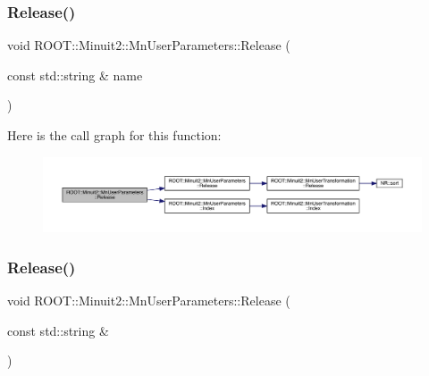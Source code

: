 \subsubsection{\texorpdfstring{Release()}{Release()}\hspace{0.1cm}{\footnotesize\ttfamily [4/6]}}
{\footnotesize\ttfamily void R\+O\+O\+T\+::\+Minuit2\+::\+Mn\+User\+Parameters\+::\+Release (\begin{DoxyParamCaption}\item[{const std\+::string \&}]{name }\end{DoxyParamCaption})}

Here is the call graph for this function\+:
\nopagebreak
\begin{figure}[H]
\begin{center}
\leavevmode
\includegraphics[width=350pt]{d6/d10/classROOT_1_1Minuit2_1_1MnUserParameters_ac178a853a9641a88a9a1412224e6e105_cgraph}
\end{center}
\end{figure}
\mbox{\label{classROOT_1_1Minuit2_1_1MnUserParameters_ac178a853a9641a88a9a1412224e6e105}} 
\subsubsection{\texorpdfstring{Release()}{Release()}\hspace{0.1cm}{\footnotesize\ttfamily [5/6]}}
{\footnotesize\ttfamily void R\+O\+O\+T\+::\+Minuit2\+::\+Mn\+User\+Parameters\+::\+Release (\begin{DoxyParamCaption}\item[{const std\+::string \&}]{ }\end{DoxyParamCaption})}

\mbox{\label{classROOT_1_1Minuit2_1_1MnUserParameters_ac178a853a9641a88a9a1412224e6e105}} 
